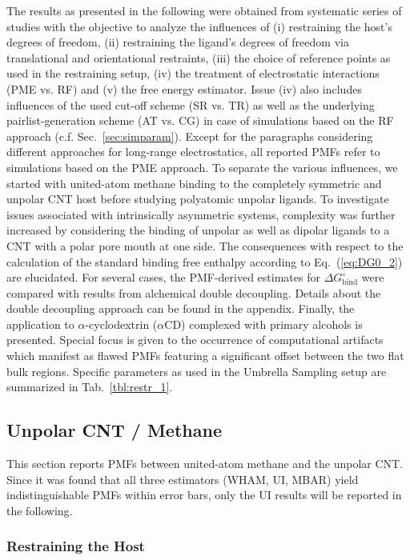 \documentclass[9pt,lessons]{livecoms}
\begin{document}
The results as presented in the following were obtained from systematic series of studies with the objective to analyze the influences of
(i) restraining the host's degrees of freedom, 
(ii) restraining the ligand's degrees of freedom via translational and orientational restraints,
(iii) the choice of reference points as used in the restraining setup,
(iv) the treatment of electrostatic interactions (PME vs. RF) and
(v) the free energy estimator.
Issue (iv) also includes influences of the used cut-off scheme (SR vs. TR) as well as the underlying pairlist-generation scheme (AT vs. CG) in case of simulations based on the RF approach (c.f. Sec.~\ref{sec:simparam}).
Except for the paragraphs considering different approaches for long-range electrostatics, all reported PMFs refer to simulations based on the PME approach.
To separate the various influences, we started with united-atom methane binding to the completely symmetric and unpolar CNT host before studying polyatomic unpolar ligands.
To investigate issues associated with intrinsically asymmetric systems, complexity was further increased by considering the binding of unpolar as well as dipolar ligands to a CNT with a polar pore mouth at one side.
The consequences with respect to the calculation of the standard binding free enthalpy according to Eq.~(\ref{eq:DG0_2}) are elucidated.
For several cases, the PMF-derived estimates for $\Delta G^\circ_\mathrm{bind}$ were compared with results from alchemical double decoupling.
Details about the double decoupling approach can be found in the appendix.
Finally, the application to $\alpha$-cyclodextrin ($\alpha$CD) complexed with primary alcohols is presented.
Special focus is given to the occurrence of computational artifacts which manifest as flawed PMFs featuring a significant offset between the two flat bulk regions.
Specific parameters as used in the Umbrella Sampling setup are summarized in Tab.~\ref{tbl:restr_1}.


\subsection{Unpolar CNT / Methane}
\label{res:UnpMet_UnpCNT}

This section reports PMFs between united-atom methane and the unpolar CNT.
Since it was found that all three estimators (WHAM, UI, MBAR) yield indistinguishable PMFs within error bars, only the UI results will be reported in the following.

\subsubsection*{Restraining the Host}
\label{subsec:rest_host}
\end{document}
